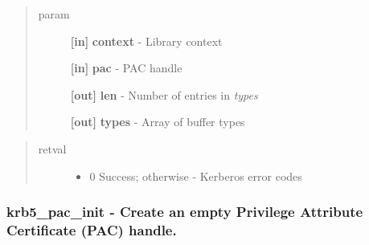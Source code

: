 \documentclass[letterpaper,10pt,english]{sphinxmanual}
\begin{document}
\begin{quote}\begin{description}
\item[{param}] \leavevmode
\textbf{{[}in{]}} \textbf{context} - Library context

\textbf{{[}in{]}} \textbf{pac} - PAC handle

\textbf{{[}out{]}} \textbf{len} - Number of entries in \emph{types}

\textbf{{[}out{]}} \textbf{types} - Array of buffer types

\end{description}\end{quote}
\begin{quote}\begin{description}
\item[{retval}] \leavevmode\begin{itemize}
\item {} 
0   Success; otherwise - Kerberos error codes

\end{itemize}

\end{description}\end{quote}


\subsubsection{krb5\_pac\_init -  Create an empty Privilege Attribute Certificate (PAC) handle.}
\label{appdev/refs/api/krb5_pac_init:krb5-pac-init-create-an-empty-privilege-attribute-certificate-pac-handle}\label{appdev/refs/api/krb5_pac_init::doc}

\begin{fulllineitems}
\label{appdev/refs/api/krb5_pac_init:c.krb5_pac_init}
\end{fulllineitems}
\end{document}
